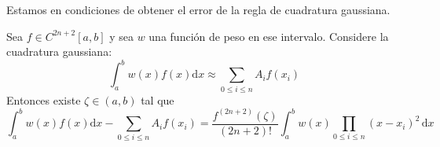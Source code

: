   Estamos en condiciones de obtener el error
  de la regla de cuadratura gaussiana.
  \begin{theorem}
    \label{theo:gauss-quadrature-error}
    Sea \(f \in C^{2 n + 2}[a, b]\) y sea \(w\) una función de peso
    en ese intervalo.
    Considere la cuadratura gaussiana:
    \begin{equation*}
      \int_a^b w(x) f(x) \mathrm{d} x
        \approx \sum_{0 \le i \le n} A_i f(x_i)
    \end{equation*}
    Entonces existe \(\zeta \in (a, b)\) tal que
    \begin{equation*}
      \int_a^b w(x) f(x) \mathrm{d} x - \sum_{0 \le i \le n} A_i f(x_i)
        = \frac{f^{(2 n + 2)}(\zeta)}{(2 n + 2)!}
            \int_a^b w(x) \prod_{0 \le i \le n} (x - x_i)^2 \, \mathrm{d} x
    \end{equation*}
  \end{theorem}
